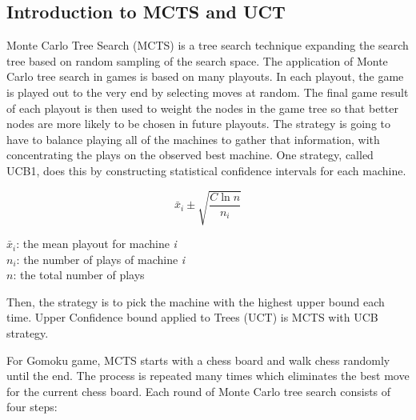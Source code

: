 \documentclass[12pt,a4paper]{article}
\begin{document}
\subsection{Introduction to MCTS and UCT}
\par Monte Carlo Tree Search (MCTS) is a tree search technique expanding the search tree based on random sampling of the search space. The application of Monte Carlo tree search in games is based on many playouts. In each playout, the game is played out to the very end by selecting moves at random. The final game result of each playout is then used to weight the nodes in the game tree so that better nodes are more likely to be chosen in
future playouts. The strategy is going to have to balance playing all of the machines to gather that information, with concentrating the plays on the observed best machine. One strategy, called UCB1, does this by constructing statistical confidence intervals for each machine.

\begin{displaymath}
\bar{x}_i \pm \sqrt{\frac{C\ln n}{n_i}}
\end{displaymath}
\begin{center}
$\bar{x}_i$: the mean playout for machine \emph{i}\\
$n_i$: the number of plays of machine \emph{i} \\
$n$: the total number of plays
\end{center}

Then, the strategy is to pick the machine with the highest upper bound each time. Upper Confidence bound applied to Trees (UCT)
is MCTS with UCB strategy.
\par For Gomoku game, MCTS starts with a chess board and walk chess randomly until the end. The process is repeated many times which eliminates the best move for the current chess board. Each round of Monte Carlo tree search consists of four steps:\\
\end{document}
